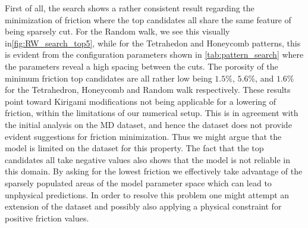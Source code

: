 First of all, the search shows a rather consistent result regarding the minimization of friction where the top candidates all share the same feature of being sparsely cut. For the Random walk, we see this visually in\cref{fig:RW_search_top5}, while for the Tetrahedon and Honeycomb patterns, this is evident from the configuration parameters shown in
\cref{tab:pattern_search} where the parameters reveal a high spacing between the
cuts. The porosity of the minimum friction top candidates are all rather low being $1.5\%$, $5.6\%$, and $1.6\%$ for the Tetrahedron, Honeycomb and Random walk respectively. These results point toward Kirigami modifications not being applicable for a lowering of friction, within the limitations of our numerical setup. This is in agreement with the initial analysis on the \acrshort{MD} dataset, and hence the dataset does not provide evident suggestions for friction minimization. Thus we might argue that the model is limited on the dataset for this property. The fact that the top candidates all take
negative values also shows that the model is not reliable in this domain. By
asking for the lowest friction we effectively take advantage of the sparsely populated areas of the model parameter space which can lead to unphysical predictions. In order to resolve this problem one might attempt an extension of the dataset and possibly also applying a physical constraint for positive friction values. 


